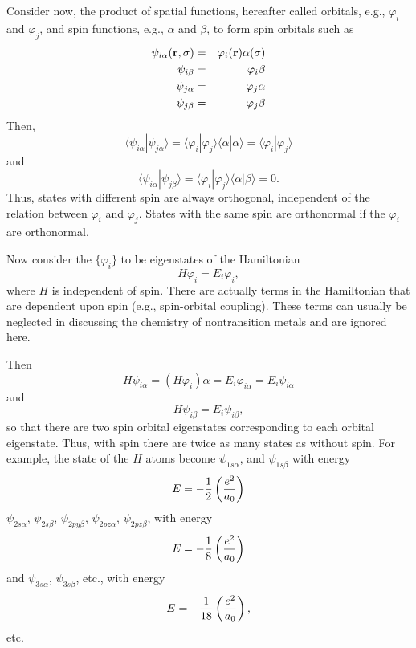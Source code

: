 Consider now, the product of spatial functions, hereafter called orbitals,
e.g., $\varphi_i$ and $\varphi_j$, and spin functions, e.g., $\alpha$ 
and $\beta$, to form spin orbitals such as
\begin{eqnarray}
\psi_{i \alpha} ( {\bf r} , \sigma ) &=& \varphi_i ( {\bf r} ) \alpha ( 
\sigma )\cr
\psi_{i \beta } &=& \varphi_i\beta\cr
\psi_{j \alpha} &=& \varphi_j\alpha\cr
\psi_{j \beta} &=& \varphi_j\beta
\end{eqnarray}
Then,
\begin{equation}
\langle \psi_{i \alpha} | \psi_{j \alpha} \rangle = \langle \varphi_i | 
\varphi_j \rangle \langle \alpha | \alpha \rangle = \langle \varphi_i | 
\varphi_j \rangle
\end{equation}
and
\begin{equation}
\langle \psi_{i \alpha} | \psi_{j \beta} \rangle = \langle \varphi_i | 
\varphi_j \rangle \langle \alpha | \beta \rangle = 0 .
\end{equation}
Thus, states with different spin are always orthogonal, independent of the 
relation between $\varphi_i$ and $\varphi_j$.  States with the same spin are 
orthonormal if the $\varphi_i$ are orthonormal.

Now consider the $\{ \varphi_i \}$ to be eigenstates of the Hamiltonian
\begin{equation}
H \varphi_i = E_i \varphi_i,
\end{equation}
where $H$ is independent of spin. There are actually terms in the
Hamiltonian that are dependent upon spin (e.g., spin-orbital
coupling).  These terms can usually be neglected in discussing the
chemistry of nontransition metals and are ignored here.

Then
\begin{equation}
H \psi_{i \alpha} = \left( H \varphi_i \right) \alpha = E_i \varphi_{i 
\alpha} = E_i \psi_{i \alpha}
\end{equation}
and
\begin{equation}
H \psi_{i \beta} = E_i \psi_{i \beta},
\end{equation}
so that there are two spin orbital eigenstates corresponding to each 
orbital eigenstate.  Thus, with spin there are twice as many states as 
without spin.  For example, the state of the $H$ atoms become $\psi_{1 s 
\alpha}$, and $\psi_{1 s \beta}$ with energy
\begin{equation}
E = - {1 \over 2} \left( {e^2 \over a_0} \right)
\end{equation}
$\psi_{2s \alpha}$, $\psi_{2s \beta}$, $\psi_{2 py \beta}$, $\psi_{2pz 
\alpha}$, $\psi_{2pz \beta}$, with energy
\begin{equation}
E = - {1 \over 8} \left( {e^2 \over a_0} \right)
\end{equation}
and $\psi_{3s \alpha}$, $\psi_{3s \beta}$, etc., with energy
\begin{equation}
E = - {1 \over 18} \left( {e^2 \over a_0} \right) ,
\end{equation}
etc.

